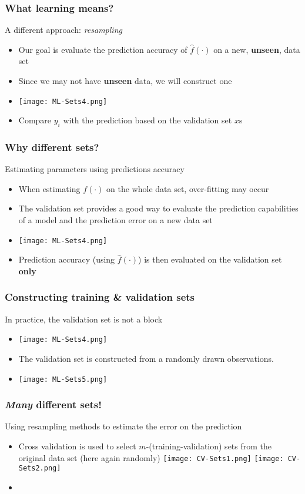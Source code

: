 \documentclass[xcolor=x11names,compress, aspectratio=169]{beamer}
\renewcommand{\(}{\begin{columns}}
\renewcommand{\)}{\end{columns}}
\newcommand{\<}[1]{\begin{column}{#1}}
\renewcommand{\>}{\end{column}}
\begin{document}
\begin{frame}
\frametitle{\textcolor{brique}{ What learning means?}}
A different approach: \textit{resampling}
\begin{itemize}[<+->]
\item Our goal is  evaluate the prediction accuracy of $\widehat f(\cdot)$ on a new, \textbf{unseen}, data set
\item Since we may not have \textbf{unseen} data, we will construct one
\item[] \texttt{[image: ML-Sets4.png]}
\item Compare $y_i$  with the prediction based on the validation set $x$s
\end{itemize}
\end{frame}



\begin{frame}
\frametitle{\textcolor{brique}{Why different sets? }}
Estimating parameters using predictions accuracy
\begin{itemize}[<+->]
\item When estimating $f(\cdot)$ on the whole data set, over-fitting may occur
\item The validation set provides a good way to evaluate the prediction capabilities of a model and the prediction error on a new data set
\item[] \texttt{[image: ML-Sets4.png]}
\item Prediction accuracy (using $\widehat f(\cdot)$) is then evaluated on the validation set \textbf{only}
\end{itemize}
\end{frame}


\begin{frame}
\frametitle{\textcolor{brique}{Constructing training \& validation sets}}
In practice, the validation set is not a block
\begin{itemize}[<+->]
\item[] \texttt{[image: ML-Sets4.png]}
\item The validation set is constructed from a randomly drawn observations.
\item[] \texttt{[image: ML-Sets5.png]}
\end{itemize}
\end{frame}



\begin{frame}
\frametitle{\textcolor{brique}{\textit{Many} different sets!  }}
Using resampling methods to  estimate the error on the prediction
\pause
\begin{itemize}[<+->]\item Cross validation is used to select $m$-(training-validation) sets from the original data set (here again randomly)
 {\texttt{[image: CV-Sets1.png]}}
 {\texttt{[image: CV-Sets2.png]}}
 \item[]
\end{itemize}
\end{frame}
\end{document}
